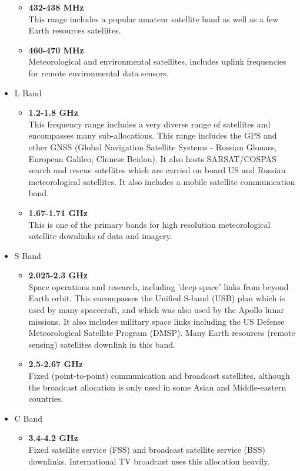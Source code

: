 \documentclass[12pt,a4paper]{report}
\begin{document}
\begin{itemize}
\begin{itemize}
	\item \textbf{432-438 MHz}\\
	This range includes a popular amateur satellite band as well as a few Earth resources satellites.
	\item \textbf{460-470 MHz}\\
	Meteorological and environmental satellites, includes uplink frequencies for remote environmental data sensors.
	\end{itemize}
\item L Band
	\begin{itemize}
	\item \textbf{1.2-1.8 GHz}
	\\This frequency range includes a very diverse range of satellites and encompasses many sub-allocations. This range includes the GPS and other GNSS (Global Navigation Satellite Systems - Russian Glonass, European Galileo, Chinese Beidou). It also hosts SARSAT/COSPAS search and rescue satellites which are carried on board US and Russian meteorological satellites. It also includes a mobile satellite communication band.
	\item \textbf{1.67-1.71 GHz}
	\\This is one of the primary bands for high resolution meteorological satellite downlinks of data and imagery.
	\end{itemize}
\item S Band
	\begin{itemize}
	\item \textbf{2.025-2.3 GHz}\\
	Space operations and research, including 'deep space' links from beyond Earth orbit. This encompasses the Unified S-band (USB) plan which is used by many spacecraft, and which was also used by the Apollo lunar missions. It also includes military space links including the US Defense Meteorological Satellite Program (DMSP). Many Earth resources (remote sensing) satellites downlink in this band.
	\item \textbf{2.5-2.67 GHz}\\
	Fixed (point-to-point) communication and broadcast satellites, although the broadcast allocation is only used in some Asian and Middle-eastern countries.
	\end{itemize}
\item C Band
	\begin{itemize}
	\item \textbf{3.4-4.2 GHz}\\
	Fixed satellite service (FSS) and broadcast satellite service (BSS) downlinks. International TV broadcast uses this allocation heavily.

\end{itemize}
\end{itemize}
\end{document}
